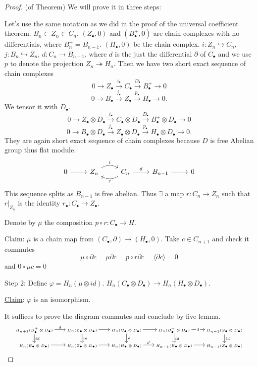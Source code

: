 \documentclass[11pt]{article}
\newcommand{\pd}{\partial}
\newcommand{\lrta}{\longrightarrow}
\newcommand{\lgl}{\langle}
\newcommand{\rgl}{\rangle}
\newcommand{\inj}{\hookrightarrow}
\newcommand{\surj}{\twoheadrightarrow}
\begin{document}
\begin{proof}(of Theorem) We will prove it in three steps:

Let's use the same notation as we did in the proof of the universal coefficient theorem.
$B_n\subset Z_n\subset C_n$. $(Z_\bullet,0)$ and $(B^+_\bullet,0)$  are chain complexes with no differentials, where $B^+_n= B_{n-1}$. $(H_\bullet,0)$ be the chain complex.
$i:Z_n\inj C_n$, $j:B_n\inj Z_n$, $d: C_n\lrta B_{n-1}$, where $d$ is the just the differential $\pd$ of $C_\bullet$ and we use $p$ to denote the projection $Z_n\surj H_n$. Then we have two short exact sequence of chain complexes
$$
0\lrta Z_\bullet\overset{i_\bullet}{\lrta}C_\bullet\overset{D_\bullet}{\lrta} B^+_\bullet\lrta 0
$$
$$
0\lrta B_\bullet\overset{j_\bullet}{\lrta}Z_\bullet\overset{p_\bullet}{\lrta} H_\bullet\lrta 0.
$$
We tensor it with $D_\bullet$.
$$
0\lrta Z_\bullet\otimes D_\bullet\overset{i_\bullet}{\lrta}C_\bullet\otimes D_\bullet\overset{D_\bullet}{\lrta} B^+_\bullet\otimes D_\bullet\lrta 0
$$
$$
0\lrta B_\bullet\otimes D_\bullet\overset{j_\bullet}{\lrta}Z_\bullet\otimes D_\bullet\overset{p_\bullet}{\lrta} H_\bullet\otimes D_\bullet\lrta 0.
$$
They are again short exact sequence of chain complexes because $D$ is free Abelian group thus flat module.
\[
\begin{tikzcd}
0 \arrow[r] & Z_n \arrow[r, "i", bend left] & C_n \arrow[l, "r", bend left] \arrow[r, "d"] & B_{n-1} \arrow[r] & 0
\end{tikzcd}
\]
This sequence splits as $B_{n-1}$ is free abelian. Thus $\exists$ a map $r:C_n\lrta Z_n$ such that $r|_{Z_n}$ is the identity
$r_\bullet:C_\bullet \lrta Z_\bullet$. 

Denote by $\mu$ the composition $p\circ r: C_\bullet \lrta H$.

Claim: $\mu$ is a chain map from $(C_\bullet,\pd)\lrta (H_\bullet,0)$. Take $c\in C_{n+1}$ and check it commutes
$$
\mu\circ \pd c=\mu\pd c=p\circ r\pd c=\lgl \pd c\rgl=0
$$
and
$0\circ \mu c=0$

Step 2: Define
$\varphi=H_n(\mu\otimes id)$. $H_n(C_\bullet\otimes D_\bullet)\lrta H_n(H_\bullet\otimes D_\bullet)$.

\underline{Claim}: $\varphi$ is an isomorphism.

It suffices to prove the diagram commutes and conclude by five lemma.
\[
\tiny
\begin{tikzcd}
H_{n+1}(B^+_\bullet\otimes D_\bullet) \arrow[d, "id"] \arrow[r, "\delta"] & H_n(Z_\bullet\otimes D_\bullet) \arrow[d, "id"] \arrow[r] & H_n(C_\bullet\otimes D_\bullet) \arrow[d, "\varphi"] \arrow[r] & H_n(B^+_\bullet\otimes D_\bullet) \arrow[d, "id"] \arrow[r, "\delta" description] & H_{n-1}(Z_\bullet\otimes D_\bullet) \arrow[d, "id"] \\
H_n(B_\bullet\otimes D_\bullet) \arrow[r] & H_n(Z_\bullet\otimes D_\bullet) \arrow[r] & H_n(H_\bullet\otimes D_\bullet) \arrow[r, "\delta'"] & H_{n-1}(B_\bullet\otimes D_\bullet) \arrow[r] & H_{n-1}(Z_\bullet\otimes D_\bullet)
\end{tikzcd}
\]


\end{proof}
\end{document}
